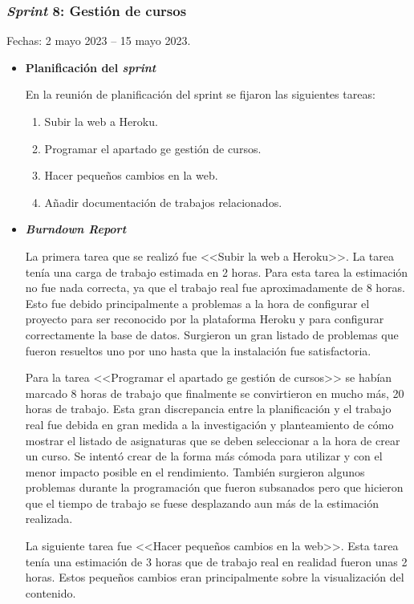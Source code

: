 \subsubsection{\textit{Sprint} 8: Gestión de cursos}
Fechas: 2 mayo 2023 -- 15 mayo 2023.
\begin{itemize}
\item\textbf{Planificación del \textit{sprint}}


En la reunión de planificación del sprint se fijaron las siguientes tareas:
\begin{enumerate}
		\item Subir la web a Heroku.
		\item Programar el apartado ge gestión de cursos.
		\item Hacer pequeños cambios en la web.
		\item Añadir documentación de trabajos relacionados.
\end{enumerate}

\item\textbf{\textit{Burndown Report}}

La primera tarea que se realizó fue <<Subir la web a Heroku>>.
La tarea tenía una carga de trabajo estimada en 2 horas.
Para esta tarea la estimación no fue nada correcta, ya que el trabajo real fue aproximadamente de 8 horas.
Esto fue debido principalmente a problemas a la hora de configurar el proyecto para ser reconocido por la plataforma Heroku y para configurar correctamente la base de datos. 
Surgieron un gran listado de problemas que fueron resueltos uno por uno hasta que la instalación fue satisfactoria.

Para la tarea <<Programar el apartado ge gestión de cursos>> se habían marcado 8 horas de trabajo que finalmente se convirtieron en mucho más, 20 horas de trabajo.
Esta gran discrepancia entre la planificación y el trabajo real fue debida en gran medida a la investigación y planteamiento de cómo mostrar el listado de asignaturas que se deben seleccionar a la hora de crear un curso.
Se intentó crear de la forma más cómoda para utilizar y con el menor impacto posible en el rendimiento.
También surgieron algunos problemas durante la programación que fueron subsanados pero que hicieron que el tiempo de trabajo se fuese desplazando aun más de la estimación realizada.

La siguiente tarea fue <<Hacer pequeños cambios en la web>>.
Esta tarea tenía una estimación de 3 horas que de trabajo real en realidad fueron unas 2 horas. 
Estos pequeños cambios eran principalmente sobre la visualización del contenido.


\end{itemize}
